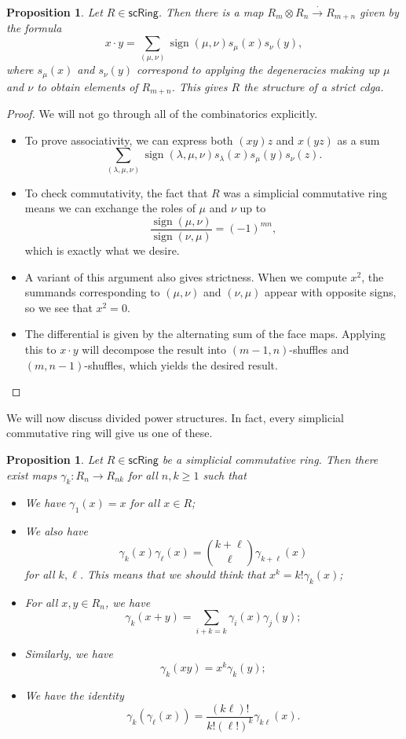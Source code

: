 \documentclass[10pt]{amsart}
\newtheorem{prop}[thm]{Proposition}
\theoremstyle{definition}
\theoremstyle{remark}
\theoremstyle{plain}
\theoremstyle{definition}
\theoremstyle{remark}
\newcommand{\on}[1]{\operatorname{#1}}
\newcommand{\ms}[1]{\mathsf{#1}}
\newcommand{\1}{\mathbf{1}}
\newcommand{\2}{\mathbf{2}}
\newcommand{\3}{\mathbf{3}}
\begin{document}
\begin{prop}
    Let $R \in \ms{scRing}$. Then there is a map \(R_m \otimes R_n \xrightarrow{\cdot} R_{m+n}\) given by the formula
    \[ x \cdot y = \sum_{(\mu, \nu)} \on{sign}(\mu, \nu) s_{\mu}(x) s_{\nu}(y), \]
    where \(s_{\mu}(x)\) and \(s_{\nu}(y)\) correspond to applying the degeneracies making up $\mu$ and $\nu$ to obtain elements of $R_{m+n}$. This gives $R$ the structure of a strict cdga.
\end{prop}

\begin{proof}
    We will not go through all of the combinatorics explicitly.
    \begin{itemize}
        \item To prove associativity, we can express both \((xy)z\) and \(x(yz)\) as a sum
        \[ \sum_{(\lambda,\mu, \nu)}\on{sign}(\lambda, \mu, \nu) s_{\lambda}(x) s_{\mu}(y) s_{\nu}(z). \]
        \item To check commutativity, the fact that $R$ was a simplicial commutative ring means we can exchange the roles of $\mu$ and $\nu$ up to 
        \[ \frac{\on{sign}(\mu, \nu)}{\on{sign}(\nu, \mu)} = (-1)^{mn}, \]
        which is exactly what we desire.
        \item A variant of this argument also gives strictness. When we compute $x^2$, the summands corresponding to $(\mu, \nu)$ and $(\nu, \mu)$ appear with opposite signs, so we see that $x^2 = 0$.
        \item The differential is given by the alternating sum of the face maps. Applying this to $x \cdot y$ will decompose the result into $(m-1, n)$-shuffles and $(m, n-1)$-shuffles, which yields the desired result. \qedhere
    \end{itemize}
\end{proof}

We will now discuss divided power structures. In fact, every simplicial commutative ring will give us one of these.

\begin{prop}
    Let $R \in \ms{scRing}$ be a simplicial commutative ring. Then there exist maps $\gamma_k \colon R_n \to R_{nk}$ for all $n, k \geq 1$ such that
    \begin{itemize}
        \item We have $\gamma_1(x) = x$ for all $x \in R$;
        \item We also have 
        \[ \gamma_k(x) \gamma_{\ell}(x) = \binom{k+\ell}{\ell} \gamma_{k+\ell}(x) \] 
        for all $k, \ell$. This means that we should think that $x^k = k! \gamma_k(x)$;
        \item For all $x,y \in R_n$, we have
        \[ \gamma_k(x+y) = \sum_{i+k=k} \gamma_i(x) \gamma_j(y); \]
        \item Similarly, we have
        \[ \gamma_k(xy) = x^k \gamma_k(y); \]
        \item We have the identity
        \[ \gamma_k (\gamma_{\ell}(x)) = \frac{(k\ell)!}{k! (\ell!)^k} \gamma_{k\ell}(x). \]
    \end{itemize}
\end{prop}
\end{document}
